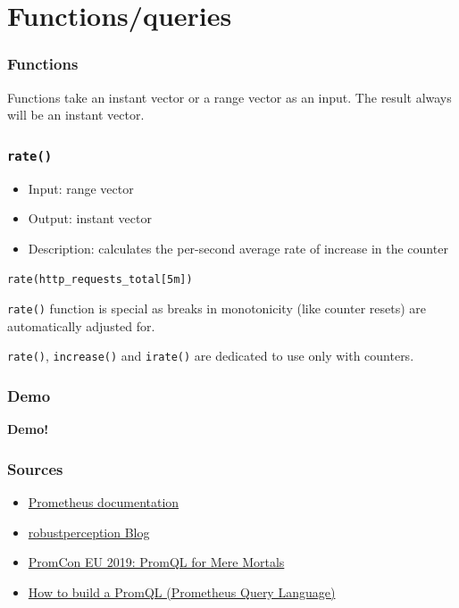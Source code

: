 \documentclass[xcolor=dvipsnames]{beamer}
\begin{document}
\section{Functions/queries}
\begin{frame}
 \frametitle{Functions}
 Functions take an instant vector or a range vector as an input. The result always will be an instant vector.
\end{frame}
\begin{frame}
 \frametitle{\texttt{rate()}}
 \begin{itemize}
  \item Input: range vector
  \item Output: instant vector
  \item Description: calculates the per-second average rate of increase in the counter
 \end{itemize}
\vspace{0.2cm}
\begin{minipage}[t]{0.98\linewidth}
 \centering
 \texttt{rate(http\_requests\_total[5m])}
\end{minipage}
\vspace{0.8cm}

\texttt{rate()} function is special as breaks in monotonicity (like counter resets) are automatically adjusted for.

\vspace{0.4cm}
\texttt{rate()}, \texttt{increase()} and \texttt{irate()} are dedicated to use only with counters.
\end{frame}
\begin{frame}

 \frametitle{Demo}
 \centering
 \Huge \textbf{Demo!}

\end{frame}
\begin{frame}

 \frametitle{Sources}
\begin{itemize}
 \item \href{https://prometheus.io/docs/introduction/overview/}{Prometheus documentation}
 \item \href{https://www.robustperception.io/}{robustperception Blog}
 \item \href{https://www.youtube.com/watch?v=hTjHuoWxsks}{PromCon EU 2019: PromQL for Mere Mortals}
 \item \href{https://www.youtube.com/watch?v=hvACEDjHQZE}{How to build a PromQL (Prometheus Query Language)}
\end{itemize}


\end{frame}
\end{document}
